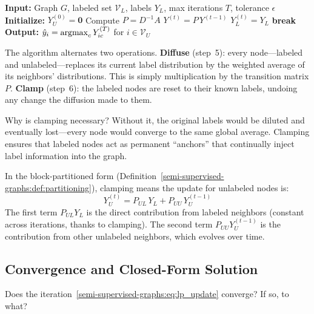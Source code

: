 \begin{notechapter}
\begin{algorithm}[H]
\caption{Label Propagation~\cite{semi-supervised-graphs:zhu2002}}
\label{semi-supervised-graphs:alg:label_prop}
\begin{algorithmic}[1]
\State \textbf{Input:} Graph $G$, labeled set $\mathcal{V}_L$, labels $Y_L$,
        max iterations $T$, tolerance $\epsilon$
\State \textbf{Initialize:} $Y_U^{(0)} = \mathbf{0}$
\State Compute $P = D^{-1}A$
    \State $Y^{(t)} = P \, Y^{(t-1)}$
    \State $Y_L^{(t)} = Y_L$ 
     \textbf{break} \EndIf
\EndFor
\State \textbf{Output:} $\hat{y}_i = \operatorname*{argmax}_c Y_{ic}^{(T)}$ for
      $i \in \mathcal{V}_U$
\end{algorithmic}
\end{algorithm}

The algorithm alternates two operations. \textbf{Diffuse} (step~5): every
node---labeled and unlabeled---replaces its current label distribution by the
weighted average of its neighbors' distributions. This is simply
multiplication by the transition matrix $P$. \textbf{Clamp} (step~6): the
labeled nodes are reset to their known labels, undoing any change the
diffusion made to them.

Why is clamping necessary? Without it, the original labels would be diluted
and eventually lost---every node would converge to the same global average.
Clamping ensures that labeled nodes act as permanent ``anchors'' that
continually inject label information into the graph.

In the block-partitioned form (Definition~\ref{semi-supervised-graphs:def:partitioning}), clamping
means the update for unlabeled nodes is:
\begin{equation}
\label{semi-supervised-graphs:eq:lp_update}
Y_U^{(t)} = P_{UL}\,Y_L + P_{UU}\,Y_U^{(t-1)}
\end{equation}
The first term $P_{UL}Y_L$ is the direct contribution from labeled neighbors
(constant across iterations, thanks to clamping). The second term
$P_{UU}Y_U^{(t-1)}$ is the contribution from other unlabeled neighbors,
which evolves over time.

\subsection{Convergence and Closed-Form Solution}

Does the iteration~\eqref{semi-supervised-graphs:eq:lp_update} converge? If so, to what?


\end{notechapter}
